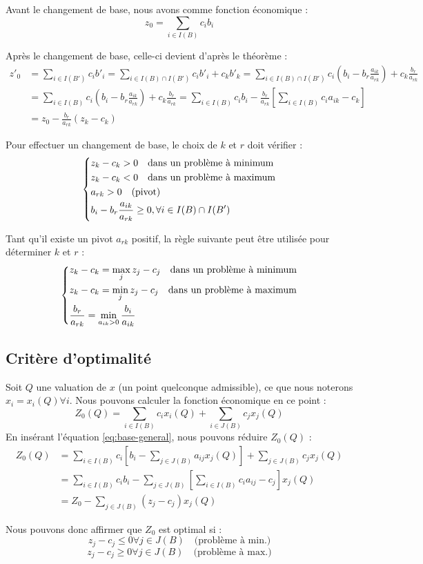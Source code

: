\documentclass[a4paper]{report}
\theoremstyle{definition}
\theoremstyle{remark}
\theoremstyle{plain}
\begin{document}
Avant le changement de base, nous avons comme fonction économique :
\[ z_0 = \sum_{i \in I(B)}{c_i b_i} \]

Après le changement de base, celle-ci devient d'après le théorème :
\begin{equation*}\begin{split}
z'_0 & = \sum_{i \in I(B')}{c_i b'_i} = \sum_{i \in I(B) \cap I(B')}{c_i b'_i} + c_k b'_k = \sum_{i \in I(B) \cap I(B')}{c_i \left( b_i - b_r \frac{a_{ik}}{a_{rk}} \right)} + c_k \frac{b_r}{a_{rk}} \\
& = \sum_{i \in I(B)}{c_i \left( b_i - b_r \frac{a_{ik}}{a_{rk}} \right)} + c_k \frac{b_r}{a_{rk}} = \sum_{i \in I(B)}{c_i b_i} - \frac{b_r}{a_{rk}} \left[ \sum_{i \in I(B)}{c_i a_{ik} - c_k} \right] \\
& = z_0 - \frac{b_r}{a_{rk}} (z_k - c_k)
\end{split}\end{equation*}

Pour effectuer un changement de base, le choix de $k$ et $r$ doit vérifier :
\[\begin{dcases}
	z_k - c_k > 0 \quad \text{dans un problème à minimum} \\
    z_k - c_k < 0 \quad \text{dans un problème à maximum} \\
    a_{rk} > 0 \quad \text{(pivot)} \\
    b_i - b_r \frac{a_{ik}}{a_{rk}} \geq 0, \forall i \in I(B) \cap I(B')
\end{dcases}\]

Tant qu'il existe un pivot $a_{rk}$ positif, la règle suivante peut être utilisée pour déterminer $k$ et $r$ :
\[\begin{dcases}
	z_k - c_k = \max_{j}{z_j - c_j} \quad \text{dans un problème à minimum} \\
    z_k - c_k = \min_{j}{z_j - c_j} \quad \text{dans un problème à maximum} \\
    \frac{b_r}{a_{rk}} = \min_{a_{ik}>0}{\frac{b_i}{a_{ik}}}
\end{dcases}\]

\subsection{Critère d'optimalité}
Soit $Q$ une valuation de $x$ (un point quelconque admissible), ce que nous noterons $x_i = x_i(Q) \forall i$. Nous pouvons calculer la fonction économique en ce point :
\[Z_0(Q) = \sum_{i \in I(B)}{c_i x_i(Q)} + \sum_{i \in J(B)}{c_j x_j(Q)} \]
En insérant l'équation \ref{eq:base-general}, nous pouvons réduire $Z_0(Q)$ :
\begin{equation}\begin{split}
Z_0(Q) & = \sum_{i \in I(B)}{c_i \left[ b_i - \sum_{j \in J(B)}{a_{ij}x_j(Q)} \right]} + \sum_{j \in J(B)}{c_j x_j(Q)} \\
& = \sum_{i \in I(B)}{c_i b_i - \sum_{j \in J(B)}{\left[ \sum_{i \in I(B)}{c_i a_{ij} - c_j} \right]} x_j(Q)} \\
& = Z_0 - \sum_{j \in J(B)}{(z_j - c_j)x_j(Q)}
\end{split}\end{equation}

Nous pouvons donc affirmer que $Z_0$ est optimal si :
\[z_j - c_j \leq 0 \forall j \in J(B) \quad \text{(problème à min.)}\]
\[z_j - c_j \geq 0 \forall j \in J(B) \quad \text{(problème à max.)}\]
\end{document}
